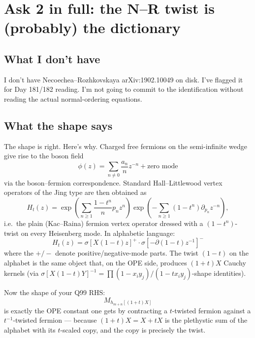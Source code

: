 \documentclass[11pt]{article}
\begin{document}
\section{Ask 2 in full: the N--R twist is (probably) the dictionary}

\subsection*{What I don't have}

I don't have Necoechea--Rozhkovskaya arXiv:1902.10049 on disk. I've flagged it for Day 181/182 reading. I'm not going to commit to the identification without reading the actual normal-ordering equations.

\subsection*{What the shape says}

The shape is right. Here's why. Charged free fermions on the semi-infinite wedge give rise to the boson field
\[
  \phi(z) = \sum_{n \ne 0} \frac{a_n}{n} z^{-n} + \text{zero mode}
\]
via the boson--fermion correspondence. Standard Hall--Littlewood vertex operators of the Jing type are then obtained as
\[
  H_t(z) = \exp\!\left(\sum_{n \ge 1} \frac{1 - t^n}{n} p_n z^n\right)
           \exp\!\left(-\sum_{n \ge 1} (1 - t^n) \partial_{p_n} z^{-n}\right),
\]
i.e.\ the plain (Kac--Raina) fermion vertex operator dressed with a $(1-t^n)$-twist on every Heisenberg mode. In alphabetic language:
\[
  H_t(z) = \sigma[X(1-t)z]^+ \cdot \sigma[-\partial(1-t)z^{-1}]^-
\]
where the $+/-$ denote positive/negative-mode parts. The twist $(1 - t)$ on the alphabet is the same object that, on the OPE side, produces $(1+t)X$ Cauchy kernels (via $\sigma[X(1-t)Y]^{-1} = \prod (1-x_i y_j)/(1-t x_i y_j)$-shape identities).

Now the shape of your Q99 RHS:
\[
  M_{h_{m+n}[(1+t)X]}
\]
is exactly the OPE constant one gets by contracting a $t$-twisted fermion against a $t^{-1}$-twisted fermion --- because $(1 + t) X = X + tX$ is the plethystic sum of the alphabet with its $t$-scaled copy, and the copy is precisely the twist.
\end{document}
